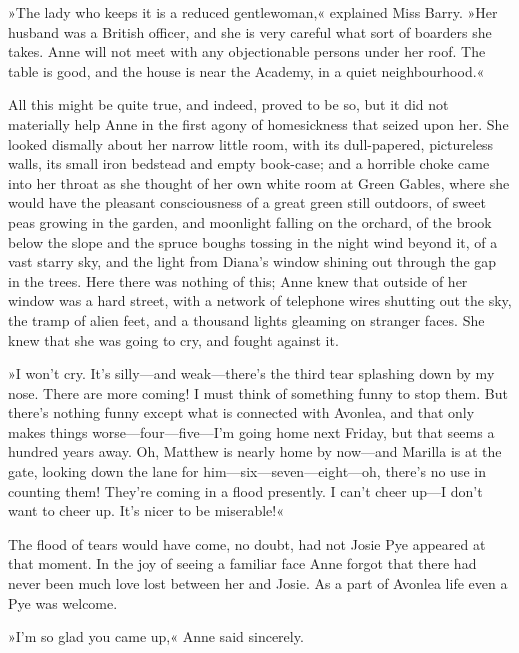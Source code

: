 »The lady who keeps it is a reduced gentlewoman,« explained Miss Barry. »Her husband was a British officer, and she is very careful what sort of boarders she takes. Anne will not meet with any objectionable persons under her roof. The table is good, and the house is near the Academy, in a quiet neighbourhood.«

All this might be quite true, and indeed, proved to be so, but it did not materially help Anne in the first agony of homesickness that seized upon her. She looked dismally about her narrow little room, with its dull-papered, pictureless walls, its small iron bedstead and empty book-case; and a horrible choke came into her throat as she thought of her own white room at Green Gables, where she would have the pleasant consciousness of a great green still outdoors, of sweet peas growing in the garden, and moonlight falling on the orchard, of the brook below the slope and the spruce boughs tossing in the night wind beyond it, of a vast starry sky, and the light from Diana’s window shining out through the gap in the trees. Here there was nothing of this; Anne knew that outside of her window was a hard street, with a network of telephone wires shutting out the sky, the tramp of alien feet, and a thousand lights gleaming on stranger faces. She knew that she was going to cry, and fought against it.

»I won’t cry. It’s silly—and weak—there’s the third tear splashing down by my nose. There are more coming! I must think of something funny to stop them. But there’s nothing funny except what is connected with Avonlea, and that only makes things worse—four—five—I’m going home next Friday, but that seems a hundred years away. Oh, Matthew is nearly home by now—and Marilla is at the gate, looking down the lane for him—six—seven—eight—oh, there’s no use in counting them! They’re coming in a flood presently. I can’t cheer up—I don’t want to cheer up. It’s nicer to be miserable!«

The flood of tears would have come, no doubt, had not Josie Pye appeared at that moment. In the joy of seeing a familiar face Anne forgot that there had never been much love lost between her and Josie. As a part of Avonlea life even a Pye was welcome.

»I’m so glad you came up,« Anne said sincerely.

